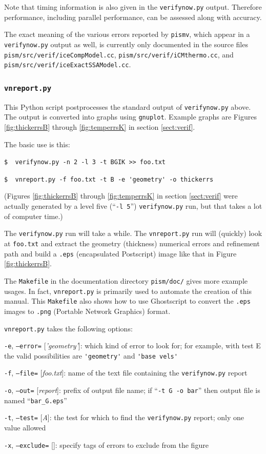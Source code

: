 \documentclass[11pt,final]{amsart}
\newcommand{\optoptdef}[3]{\vspace{1mm}\noindent \large\texttt{-#1},\,\,\texttt{--#2=}\normalsize\,\,[\textsl{#3}]:\quad}
\begin{document}
\medskip
Note that timing information is also given in the \verb|verifynow.py| output.  Therefore performance, including parallel performance, can be assessed along with accuracy.

The exact meaning of the various errors reported by \verb|pismv|, which appear in a \verb|verifynow.py| output as well, is currently only documented in the source files \verb|pism/src/verif/iceCompModel.cc|, \verb|pism/src/verif/iCMthermo.cc|, and \verb|pism/src/verif/iceExactSSAModel.cc|.  


\subsubsection*{\Large{\texttt{vnreport.py}}}  This Python script postprocesses the standard output of \verb|verifynow.py| above.  The output is converted into graphs using \verb|gnuplot|.  Example graphs are Figures \ref{fig:thickerrsB} through \ref{fig:temperrsK} in section \ref{sect:verif}.

The basic use is this:

\verb|$  verifynow.py -n 2 -l 3 -t BGIK >> foo.txt|

\verb|$  vnreport.py -f foo.txt -t B -e 'geometry' -o thickerrs|

\noindent (Figures \ref{fig:thickerrsB} through \ref{fig:temperrsK} in section \ref{sect:verif} were actually generated by a level five (``\verb|-l 5|'') \verb|verifynow.py| run, but that takes a lot of computer time.)

The \verb|verifynow.py| run will take a while.  The \verb|vnreport.py| run will (quickly) look at \verb|foo.txt| and extract the geometry (thickness) numerical errors and refinement path and build a \verb|.eps| (encapsulated Postscript) image like that in Figure \ref{fig:thickerrsB}.

The \verb|Makefile| in the documentation directory \verb|pism/doc/| gives more example usages.  In fact, \verb|vnreport.py| is primarily used to automate the creation of this manual.  This \verb|Makefile| also shows how to use Ghostscript to convert the \verb|.eps| images to \verb|.png| (Portable Network Graphics) format.

\verb|vnreport.py| takes the following options:

\optoptdef{e}{error}{'geometry'} which kind of error to look for; for example, with test E the valid possibilities are \verb|'geometry'| and \verb|'base vels'|

\optoptdef{f}{file}{foo.txt} name of the text file containing the \verb|verifynow.py| report

\optoptdef{o}{out}{report} prefix of output file name; if ``\verb|-t G -o bar|'' then output file is named ``\verb|bar_G.eps|''

\optoptdef{t}{test}{A} the test for which to find the \verb|verifynow.py| report; only one value allowed

\optoptdef{x}{exclude}{} specify tags of errors to exclude from the figure


\end{document}
